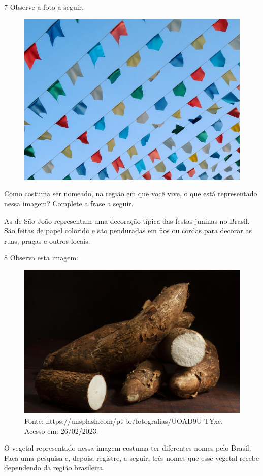 
\pagebreak

\num{7} Observe a foto a seguir.

\begin{figure}[htpb!]
\includegraphics[width=.5\textwidth]{./imgs/img19.jpg}
\end{figure}


Como costuma ser nomeado, na região em que você vive, o que está representado nessa imagem?
Complete a frase a seguir.\bigskip

\noindent{}As  de São João representam uma decoração típica das
festas juninas no Brasil. São feitas de papel colorido e são penduradas
em fios ou cordas para decorar as ruas, praças e outros locais.

\bigskip

\num{8} Observa esta imagem:

\begin{figure}[htpb!]
\includegraphics[width=.5\textwidth]{./imgs/img19b.jpg}
\caption{Fonte: https://unsplash.com/pt-br/fotografias/UOAD9U-TYxc. Acesso em: 26/02/2023.}
\end{figure}

O vegetal representado nessa imagem costuma ter diferentes nomes pelo Brasil.
Faça uma pesquisa e, depois, registre, a seguir, três nomes que esse vegetal recebe dependendo da região brasileira.

